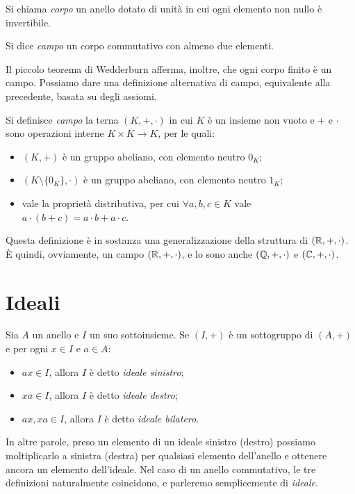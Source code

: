 \begin{definizione}
Si chiama \emph{corpo} un anello dotato di unità in cui ogni elemento non nullo è invertibile.
\end{definizione}

\begin{definizione} \label{d:campo1}
Si dice \emph{campo} un corpo commutativo con almeno due elementi.
\end{definizione}
Il piccolo teorema di Wedderburn afferma, inoltre, che ogni corpo finito è un campo.
Possiamo dare una definizione alternativa di campo, equivalente alla precedente, basata su degli assiomi.
\begin{definizione} \label{d:campo2}
Si definisce \emph{campo} la terna $(K,+,\cdot)$ in cui $K$ è un insieme non vuoto e $+$ e $\cdot$ sono operazioni interne $K\times K\to K$, per le quali:
\begin{itemize}
\item $(K,+)$ è un gruppo abeliano, con elemento neutro $0_K$;
\item $(K\setminus\{0_K\},\cdot)$ è un gruppo abeliano, con elemento neutro $1_K$;
\item vale la proprietà distributiva, per cui $\forall a,b,c\in K$ vale $a\cdot(b+c)=a\cdot b+a\cdot c$.
\end{itemize}
\end{definizione}
Questa definizione è in sostanza una generalizzazione della struttura di $(\mathbb{R},+,\cdot)$. È quindi, ovviamente, un campo $(\mathbb{R},+,\cdot)$, e lo sono anche $(\mathbb{Q},+,\cdot)$ e $(\mathbb{C},+,\cdot)$.


\section{Ideali} \label{sec:ideali}
\begin{definizione} \label{d:ideale}
	Sia $A$ un anello e $I$ un suo sottoinsieme.
	Se $(I,+)$ è un sottogruppo di $(A,+)$ e per ogni $x\in I$ e $a\in A$:
	\begin{itemize}
		\item $ax\in I$, allora $I$ è detto \emph{ideale sinistro};
		\item $xa\in I$, allora $I$ è detto \emph{ideale destro};
		\item $ax,xa\in I$, allora $I$ è detto \emph{ideale bilatero}.
	\end{itemize}
\end{definizione}
In altre parole, preso un elemento di un ideale sinistro (destro) possiamo moltiplicarlo a sinistra (destra) per qualsiasi elemento dell'anello e ottenere ancora un elemento dell'ideale.
Nel caso di un anello commutativo, le tre definizioni naturalmente coincidono, e parleremo semplicemente di \emph{ideale}.

